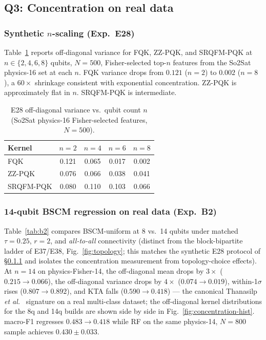 \documentclass[pdflatex,sn-mathphys]{sn-jnl}
\theoremstyle{plain}
\theoremstyle{remark}
\theoremstyle{definition}
\begin{document}
\subsection{Q3: Concentration on real data}

\subsubsection{Synthetic $n$-scaling (Exp.\ E28)}\label{sec:conc-results}
Table~\ref{tab:e28} reports off-diagonal variance for FQK, ZZ-PQK, and SRQFM-PQK at $n\in \{2,4,6,8\}$ qubits, $N=500$, Fisher-selected top-$n$ features from the So2Sat physics-16 set at each $n$. FQK variance drops from $0.121$ ($n=2$) to $0.002$ ($n=8$), a $60\!\times$ shrinkage consistent with exponential concentration. ZZ-PQK is approximately flat in $n$. SRQFM-PQK is intermediate.

\begin{table}[htbp]
\caption{E28 off-diagonal variance vs.\ qubit count $n$ (So2Sat physics-16 Fisher-selected features, $N=500$).}
\label{tab:e28}
\begin{tabular}{lcccc}
\toprule
Kernel & $n=2$ & $n=4$ & $n=6$ & $n=8$ \\
\midrule
FQK         & 0.121 & 0.065 & 0.017 & 0.002 \\
ZZ-PQK      & 0.076 & 0.066 & 0.038 & 0.041 \\
SRQFM-PQK   & 0.080 & 0.110 & 0.103 & 0.066 \\
\bottomrule
\end{tabular}
\end{table}

\subsubsection{14-qubit BSCM regression on real data (Exp.\ B2)}
Table~\ref{tab:b2} compares BSCM-uniform at 8 vs.\ 14 qubits under matched $\tau=0.25$, $r=2$, and \emph{all-to-all} connectivity (distinct from the block-bipartite ladder of E37/E38, Fig.~\ref{fig:topology}; this matches the synthetic E28 protocol of \S\ref{sec:conc-results} and isolates the concentration measurement from topology-choice effects). At $n=14$ on physics-Fisher-14, the off-diagonal mean drops by $3\!\times$ ($0.215\to 0.066$), the off-diagonal variance drops by $4\!\times$ ($0.074\to 0.019$), within-1$\sigma$ rises ($0.807\to 0.892$), and KTA falls ($0.590\to 0.418$) --- the canonical Thanasilp \emph{et al.}\ \cite{thanasilp2024} signature on a real multi-class dataset; the off-diagonal kernel distributions for the 8q and 14q builds are shown side by side in Fig.~\ref{fig:concentration-hist}. macro-F1 regresses $0.483\to 0.418$ while RF on the same physics-14, $N=800$ sample achieves $0.430\!\pm\!0.033$.
\end{document}
